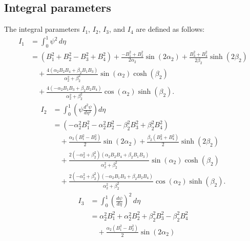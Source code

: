 \documentclass[preprint,12pt]{elsarticle}
\begin{document}
\FloatBarrier
\begin{appendices}
\renewcommand{\theequation}{\thesection.\arabic{equation}}
\section{Integral parameters}\label{appendA}
The integral parameters $ I_1$, $I_2$, $I_3$, and $ I_4$ are defined as follows:
%
\begin{equation}\label{eq:inte_phi}
	\begin{aligned}
		I_1 &= \int_{0}^{1} \psi^2 \, d\eta \\
		&= (B_1^2 + B_2^2 - B_3^2 + B_4^2) 
		+ \frac{-B_1^2 + B_2^2}{2\alpha_2} \sin(2\alpha_2) 
		+ \frac{B_3^2 + B_4^2}{2\beta_2} \sinh(2\beta_2) \\
		&\quad + \frac{4(\alpha_2 B_2B_4 + \beta_2 B_1B_3)}{\alpha_2^2 + \beta_2^2} \sin(\alpha_2) \cosh(\beta_2) \\
		&\quad + \frac{4(-\alpha_2 B_1B_3 + \beta_2 B_2B_4)}{\alpha_2^2 + \beta_2^2} \cos(\alpha_2) \sinh(\beta_2).
	\end{aligned}
\end{equation}
%
\begin{equation}\label{eq:inte_dphi2}
\begin{split}
	I_2 &= \int_{0}^{1} \left( \psi \frac{d^2 \psi}{d \eta^2} \right) d \eta \\
	&= \left( -\alpha_2^2 B_1^2 - \alpha_2^2 B_2^2 - \beta_2^2 B_3^2 + \beta_2^2 B_4^2 \right) \\
	&\quad + \frac{\alpha_2 (B_1^2 - B_2^2)}{2} \sin(2 \alpha_2) 
	 + \frac{\beta_2 (B_3^2 + B_4^2)}{2} \sinh(2 \beta_2) \\
	&\quad + \frac{2(-\alpha_2^2 + \beta_2^2) (\alpha_2 B_2 B_4 + \beta_2 B_1 B_3)}{\alpha_2^2 + \beta_2^2} \sin(\alpha_2) \cosh(\beta_2) \\
	&\quad + \frac{2(-\alpha_2^2 + \beta_2^2) (-\alpha_2 B_1 B_3 + \beta_2 B_2 B_4)}{\alpha_2^2 + \beta_2^2} \cos(\alpha_2) \sinh(\beta_2).
\end{split}
\end{equation}
%
\begin{equation}\label{eq:inte_dphi3}
	\begin{aligned}
		I_3 &= \int_{0}^{1} \left(\frac{d\psi}{d\eta}\right)^2 \, d\eta \\
		&= \alpha_2^2 B_1^2 + \alpha_2^2 B_2^2 + \beta_2^2 B_3^2 - \beta_2^2 B_4^2 \\
		&\quad + \frac{\alpha_2 (B_1^2 - B_2^2)}{2} \sin(2\alpha_2) 

\end{aligned}
\end{equation}
\end{appendices}
\end{document}
